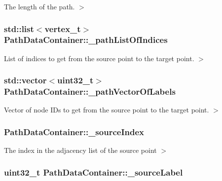 The length of the path. $>$ 

\hypertarget{classPathDataContainer_a4fc598d01fec07280012333ec2ae41a8}{
\subsubsection[{\-\_\-path\-List\-Of\-Indices}]{\setlength{\rightskip}{0pt plus 5cm}std\-::list$<${\bf vertex\-\_\-t}$>$ Path\-Data\-Container\-::\-\_\-path\-List\-Of\-Indices}}\label{classPathDataContainer_a4fc598d01fec07280012333ec2ae41a8}


List of indices to get from the source point to the target point. $>$ 

\hypertarget{classPathDataContainer_a295280af08a51cdf16fbba3c106cf35b}{
\subsubsection[{\-\_\-path\-Vector\-Of\-Labels}]{\setlength{\rightskip}{0pt plus 5cm}std\-::vector$<$uint32\-\_\-t$>$ Path\-Data\-Container\-::\-\_\-path\-Vector\-Of\-Labels}}\label{classPathDataContainer_a295280af08a51cdf16fbba3c106cf35b}


Vector of node I\-Ds to get from the source point to the target point. $>$ 

\hypertarget{classPathDataContainer_a2ba5058e1240bf7b2d5c7cfba9058cde}{
\subsubsection[{\-\_\-source\-Index}]{ Path\-Data\-Container\-::\-\_\-source\-Index}}\label{classPathDataContainer_a2ba5058e1240bf7b2d5c7cfba9058cde}


The index in the adjacency list of the source point $>$ 

\hypertarget{classPathDataContainer_a938627791e643867d3a5a67b92141cbf}{
\subsubsection[{\-\_\-source\-Label}]{\setlength{\rightskip}{0pt plus 5cm}uint32\-\_\-t Path\-Data\-Container\-::\-\_\-source\-Label}}\label{classPathDataContainer_a938627791e643867d3a5a67b92141cbf}


